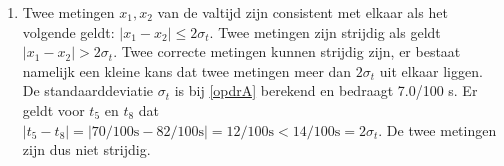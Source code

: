 \documentclass[12pt, dutch, a4paper]{article}
\theoremstyle{definition}
\begin{document}
\begin{enumerate}[(a.)]
\newpage
\item \label{opdrD} 
Twee metingen $x_1, x_2$ van de valtijd zijn consistent met elkaar als het volgende geldt: $\lvert x_1 - x_2 \rvert \leq 2\sigma_{t}$. Twee metingen zijn strijdig als geldt $\lvert x_1 - x_2 \rvert > 2\sigma_{t}$. Twee correcte metingen kunnen strijdig zijn, er bestaat namelijk een kleine kans dat twee metingen meer dan $2\sigma_{t}$ uit elkaar liggen. De standaarddeviatie $\sigma_{t}$ is bij \ref{opdrA} berekend en bedraagt 7.0/100 s. Er geldt voor $t_5$ en $t_8$ dat $\lvert t_5 - t_8 \rvert = \lvert 70/100 \unit{\second} - 82/100 \unit{\second} \rvert = 12/100 \unit{\second} < 14/100 \unit{\second} = 2\sigma_{t}$. De twee metingen zijn dus niet strijdig. 



\end{enumerate}
\end{document}
